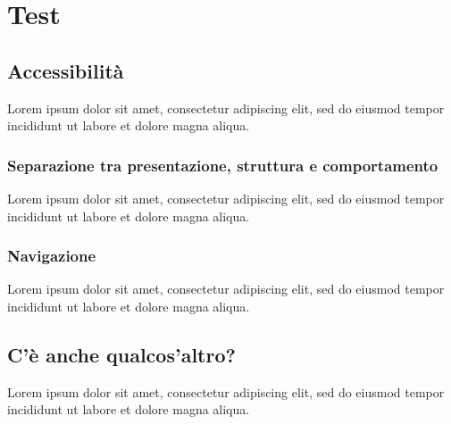\section{Test}
\subsection{Accessibilità}
Lorem ipsum dolor sit amet, consectetur adipiscing elit, sed do eiusmod tempor incididunt ut labore et dolore magna aliqua.

\subsubsection{Separazione tra presentazione, struttura e comportamento}
Lorem ipsum dolor sit amet, consectetur adipiscing elit, sed do eiusmod tempor incididunt ut labore et dolore magna aliqua. 

\subsubsection{Navigazione}
Lorem ipsum dolor sit amet, consectetur adipiscing elit, sed do eiusmod tempor incididunt ut labore et dolore magna aliqua. 

\subsection{C'è anche qualcos'altro?}
Lorem ipsum dolor sit amet, consectetur adipiscing elit, sed do eiusmod tempor incididunt ut labore et dolore magna aliqua.